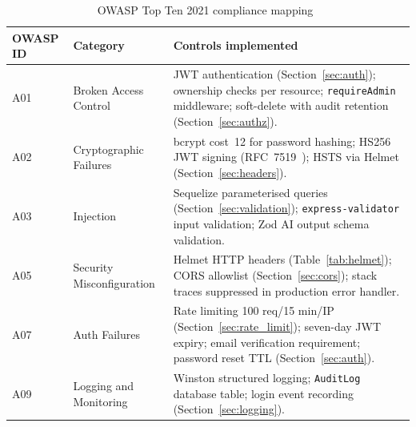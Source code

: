 \begin{table}[H]
  \centering
  \caption{OWASP Top Ten 2021 compliance mapping~\cite{owasp2021}}
  \label{tab:owasp}
  \begin{tabularx}{\linewidth}{llX}
    \toprule
    \textbf{OWASP ID} & \textbf{Category} & \textbf{Controls implemented} \\
    \midrule
    A01 & Broken Access Control
        & JWT authentication (Section~\ref{sec:auth}); ownership checks per resource; \texttt{requireAdmin} middleware; soft-delete with audit retention (Section~\ref{sec:authz}). \\
    A02 & Cryptographic Failures
        & bcrypt cost~12 for password hashing; HS256 JWT signing (RFC~7519~\cite{jwt2015}); HSTS via Helmet (Section~\ref{sec:headers}). \\
    A03 & Injection
        & Sequelize parameterised queries (Section~\ref{sec:validation}); \texttt{express-validator} input validation; Zod AI output schema validation. \\
    A05 & Security Misconfiguration
        & Helmet HTTP headers (Table~\ref{tab:helmet}); CORS allowlist (Section~\ref{sec:cors}); stack traces suppressed in production error handler. \\
    A07 & Auth Failures
        & Rate limiting 100 req/15 min/IP (Section~\ref{sec:rate_limit}); seven-day JWT expiry; email verification requirement; password reset TTL (Section~\ref{sec:auth}). \\
    A09 & Logging and Monitoring
        & Winston structured logging; \texttt{AuditLog} database table; login event recording (Section~\ref{sec:logging}). \\
    \bottomrule
  \end{tabularx}
\end{table}
